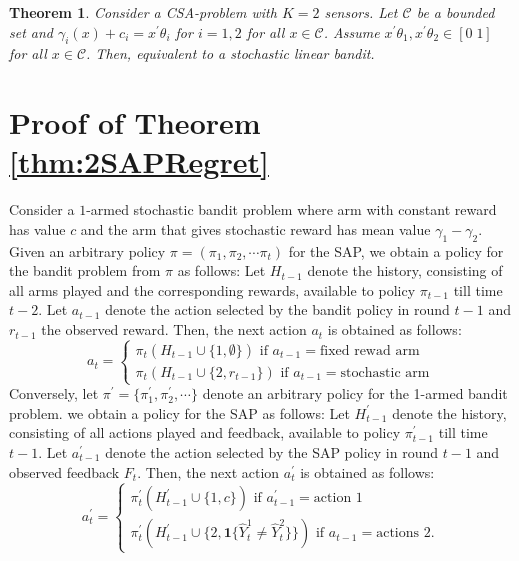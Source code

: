 \documentclass{article}
\newtheorem{thm}{Theorem}
\begin{document}
\begin{thm}
\label{thm:2CSAPRegret}
Consider a CSA-problem with $K=2$ sensors. Let $\mathcal{C}$ be a bounded set and $\gamma_i(x)+c_i=x^\prime\theta_i$ for $i=1,2$ for all $x \in \mathcal{C}$. Assume $x^\prime \theta_1, x^\prime \theta_2 \in [0\; 1]$ for all $x \in \mathcal{C}$. Then, equivalent to a stochastic linear bandit. 
\end{thm}



\newpage

%

\newpage
\appendix
\section{Proof of Theorem \ref{thm:2SAPRegret}}
Consider a $1$-armed stochastic bandit problem where arm with constant reward has value $c$ and the arm that gives stochastic reward has mean value  $\gamma_1-\gamma_2$.  
Given an arbitrary policy $\pi=(\pi_1, \pi_2, \cdots \pi_t )$ for the SAP, we obtain a policy for the bandit problem from $\pi$ as follows: Let $H_{t-1}$ denote the history, consisting of all arms played and the corresponding rewards, available to policy $\pi_{t-1}$ till time $t-2$. Let $a_{t-1}$ denote the action selected by the bandit policy  in round $t-1$ and $r_{t-1}$ the observed reward. Then, the next action $a_t$ is obtained as follows:
\begin{equation}
\label{eqn:SAPto1Bandit}
a_t=
\begin{cases}
\pi_t(H_{t-1}\cup \{1, \emptyset
\}) \mbox{ if } a_{t-1}= \mbox{fixed rewad arm}	\\
\pi_t(H_{t-1} \cup \{2, r_{t-1}\}) \mbox{ if } a_{t-1}= \mbox{stochastic arm}
\end{cases}
\end{equation}
\noindent
Conversely, let $\pi^\prime=\{\pi^\prime_1, \pi^\prime_2,\cdots\}$ denote an arbitrary policy for the 1-armed bandit problem. we obtain a policy for the SAP as follows: Let $H^\prime_{t-1}$ denote the history, consisting of all actions played and feedback, available to policy $\pi^\prime_{t-1}$ till time $t-1$. Let $a^\prime_{t-1}$ denote the action selected by the SAP policy in round $t-1$ and observed feedback $F_t$. Then, the next action $a^\prime_t$ is obtained as follows:
\begin{equation}
\label{eqn:1BanditToSAP}
a^\prime_t=
\begin{cases}
\pi^\prime_t(H^\prime_{t-1} \cup \{1, c
\}) \mbox{ if } a^\prime_{t-1}= \mbox{action 1}	\\
\pi^\prime_t(H^\prime_{t-1} \cup \{2, \boldsymbol{1}\{\hat{Y}_t^1\neq \hat{Y}_t^2\}\}) \mbox{ if } a_{t-1}= \mbox{actions 2}.
\end{cases}
\end{equation}
\end{document}
